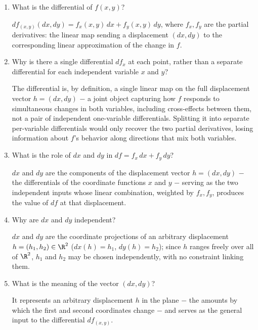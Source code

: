\documentclass{self-check}
\begin{document}
\begin{enumerate}[resume, leftmargin=*, itemsep=8pt]
  \item What is the differential of \(f(x,y)\)?
    \begin{answer}
      \(df_{(x,y)}(dx,dy)=f_{x}(x,y)\,dx+f_{y}(x,y)\,dy\), where \(f_{x},f_{y}\) are the partial derivatives: the linear map sending a displacement \((dx,dy)\) to the corresponding linear approximation of the change in \(f\).
    \end{answer}
  \item Why is there a single differential \(df_{x}\) at each point, rather than a separate differential for each independent variable \(x\) and \(y\)?
    \begin{answer}
      The differential is, by definition, a single linear map on the full displacement vector \(h=(dx,dy)\) \(-\) a joint object capturing how \(f\) responds to simultaneous changes in both variables, including cross-effects between them, not a pair of independent one-variable differentials. Splitting it into separate per-variable differentials would only recover the two partial derivatives, losing information about \(f\)'s behavior along directions that mix both variables.
    \end{answer}
  \item What is the role of \(dx\) and \(dy\) in \(df=f_{x}\,dx+f_{y}\,dy\)?
    \begin{answer}
      \(dx\) and \(dy\) are the components of the displacement vector \(h=(dx,dy)\) \(-\) the differentials of the coordinate functions \(x\) and \(y\) \(-\) serving as the two independent inputs whose linear combination, weighted by \(f_{x},f_{y}\), produces the value of \(df\) at that displacement.
    \end{answer}
  \item Why are \(dx\) and \(dy\) independent?
    \begin{answer}
      \(dx\) and \(dy\) are the coordinate projections of an arbitrary displacement \(h=(h_{1},h_{2})\in\R^{2}\) (\(dx(h)=h_{1}\), \(dy(h)=h_{2}\)); since \(h\) ranges freely over all of \(\R^{2}\), \(h_{1}\) and \(h_{2}\) may be chosen independently, with no constraint linking them.
    \end{answer}
  \item What is the meaning of the vector \((dx,dy)\)?
    \begin{answer}
      It represents an arbitrary displacement \(h\) in the plane \(-\) the amounts by which the first and second coordinates change \(-\) and serves as the general input to the differential \(df_{(x,y)}\).

\end{answer}
\end{enumerate}
\end{document}
